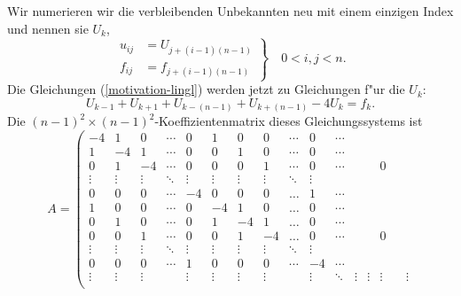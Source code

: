 Wir numerieren wir die verbleibenden Unbekannten neu mit einem
einzigen Index und nennen sie $U_k$,
\begin{equation}
\left.
\begin{aligned}
u_{ij}&=U_{j + (i - 1)(n - 1)}
\\
f_{ij}&=f_{j + (i-1)(n-1)}
\end{aligned}
\right\}
\quad 0<i,j<n.
\end{equation}
Die Gleichungen (\ref{motivation-lingl}) werden jetzt zu Gleichungen
f"ur die $U_k$:
\begin{equation}
U_{k-1}+U_{k+1}+U_{k-(n-1)}+U_{k+(n-1)}-4U_k=f_k.
\end{equation}
Die $(n-1)^2\times(n-1)^2$-Koeffizientenmatrix dieses Gleichungssystems ist
\[
A=\left(
\begin{array}{ccccc|ccccc|c|ccccc}
    -4&     1&     0&\cdots&     0 &     1&     0&     0&\cdots&     0 &\cdots &      &      &      &      &      \\
     1&    -4&     1&\cdots&     0 &     0&     1&     0&\cdots&     0 &\cdots &      &      &      &      &      \\
     0&     1&    -4&\cdots&     0 &     0&     0&     1&\cdots&     0 &\cdots &      &      &     0&      &      \\
\vdots&\vdots&\vdots&\ddots&\vdots &\vdots&\vdots&\vdots&\ddots&\vdots &       &      &      &      &      &      \\
     0&     0&     0&\cdots&    -4 &     0&     0&     0&\dots &     1 &\cdots &      &      &      &      &      \\
\hline
     1&     0&     0&\cdots&     0 &    -4&     1&     0&\dots &     0 &\cdots &      &      &      &      &      \\
     0&     1&     0&\cdots&     0 &     1&    -4&     1&\dots &     0 &\cdots &      &      &      &      &      \\
     0&     0&     1&\cdots&     0 &     0&     1&    -4&\dots &     0 &\cdots &      &      &     0&      &      \\
\vdots&\vdots&\vdots&\ddots&\vdots &\vdots&\vdots&\vdots&\ddots&\vdots &       &      &      &      &      &      \\
     0&     0&     0&\cdots&     1 &     0&     0&     0&\cdots&    -4 &\cdots &      &      &      &      &      \\
\hline
\vdots&\vdots&\vdots&      &\vdots &\vdots&\vdots&\vdots&      &\vdots &\ddots &\vdots&\vdots&\vdots&      &\vdots\\

\end{array}\]
